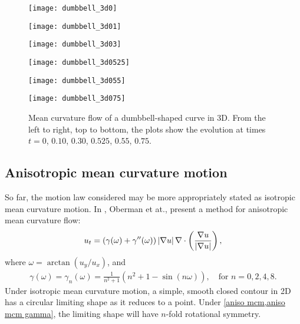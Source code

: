 \begin{figure}[htb!]
        \centering
\begin{minipage}{0.48\textwidth}
        \texttt{[image: dumbbell\_3d0]}
\end{minipage}%
\begin{minipage}{0.48\textwidth}
        \texttt{[image: dumbbell\_3d01]}
\end{minipage}
\begin{minipage}{0.48\textwidth}
        \texttt{[image: dumbbell\_3d03]}
\end{minipage}%
\begin{minipage}{0.48\textwidth}
        \texttt{[image: dumbbell\_3d0525]}
\end{minipage}
\begin{minipage}{0.48\textwidth}
        \texttt{[image: dumbbell\_3d055]}
\end{minipage}%
\begin{minipage}{0.48\textwidth}
        \texttt{[image: dumbbell\_3d075]}
\end{minipage}
\caption[Mean curvature flow of a dumbbell-shaped curve in 3D]{Mean curvature flow of a dumbbell-shaped curve in 3D. From the left to right, top to bottom, the plots show the evolution at times $t=0$, $0.10$, $0.30$, $0.525$, $0.55$, $0.75$.}
\label{fig:mcm 3d dumbbell}
\end{figure}


\subsection{Anisotropic mean curvature motion}
So far, the motion law considered may be more appropriately stated as isotropic mean curvature motion. In \cite{oberman2011aniso}, Oberman et at., present a method for anisotropic mean curvature flow: 
\begin{align}
        u_t = (\gamma(\omega) + \gamma''(\omega))\left|\nabla u\right| \nabla \cdot \left( \frac{\nabla u}{\left|\nabla u\right|} \right),
\label{aniso mcm}
\end{align}
where $\omega = \arctan(u_y/u_x)$, and 
\begin{align}
        \gamma(\omega) 
= \gamma_n(\omega) 
= \frac{1}{n^2+1}(n^2 + 1 - \sin(n\omega)), 
\quad\text{for } n = 0,2,4,8.
\label{aniso mcm gamma}
\end{align}
Under isotropic mean curvature motion, a simple, smooth closed contour in 2D has a circular limiting shape as it reduces to a point. Under \cref{aniso mcm,aniso mcm gamma}, the limiting shape will have $n$-fold rotational symmetry.

